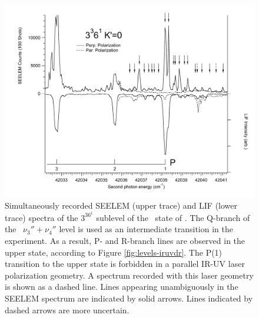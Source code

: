 \begin{figure}
  \caption{Simultaneously recorded SEELEM (upper trace) and LIF (lower
    trace) spectra of the $3^36^1$  sublevel of the \astate\
    state of .  The Q-branch of the \xstate\ $\nu_3'' +
    \nu_4''$ level is used as an intermediate transition in the
    experiment.  As a result, P- and R-branch lines are observed in
    the upper state, according to Figure \ref{fig:levels-iruvdr}.  The
    P(1) transition to the upper state is forbidden in a parallel
    IR-UV laser polarization geometry.  A spectrum recorded with this
    laser geometry is shown as a dashed line.  Lines appearing
    unambiguously in the SEELEM spectrum are indicated by solid
    arrows.  Lines indicated by dashed arrows are more uncertain.}
  \label{fig:3361-p1-polarization}
  \centering
  \includegraphics[width=7.3in,angle=90]{spectrum-3361-p1-polpeaks.pdf}
\end{figure}


